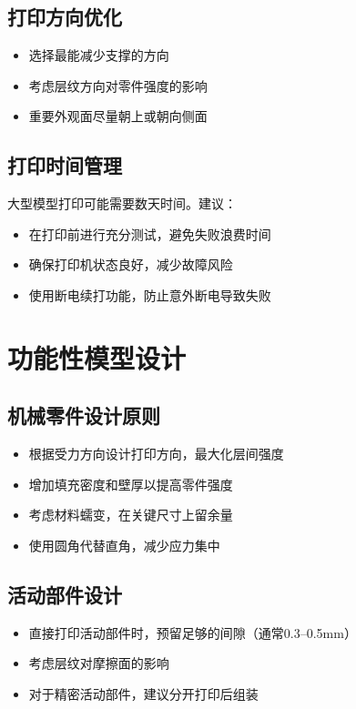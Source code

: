 \documentclass[12pt,UTF8]{ctexbook}
\begin{document}
\subsection{打印方向优化}
\begin{itemize}
\item 选择最能减少支撑的方向
\item 考虑层纹方向对零件强度的影响
\item 重要外观面尽量朝上或朝向侧面
\end{itemize}

\subsection{打印时间管理}
大型模型打印可能需要数天时间。建议：
\begin{itemize}
\item 在打印前进行充分测试，避免失败浪费时间
\item 确保打印机状态良好，减少故障风险
\item 使用断电续打功能，防止意外断电导致失败
\end{itemize}

\section{功能性模型设计}

\subsection{机械零件设计原则}
\begin{itemize}
\item 根据受力方向设计打印方向，最大化层间强度
\item 增加填充密度和壁厚以提高零件强度
\item 考虑材料蠕变，在关键尺寸上留余量
\item 使用圆角代替直角，减少应力集中
\end{itemize}

\subsection{活动部件设计}
\begin{itemize}
\item 直接打印活动部件时，预留足够的间隙（通常0.3--0.5mm）
\item 考虑层纹对摩擦面的影响
\item 对于精密活动部件，建议分开打印后组装
\end{itemize}
\end{document}
